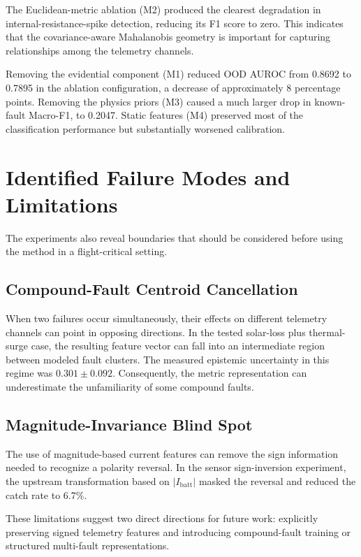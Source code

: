 \documentclass[conference]{IEEEtran}
\begin{document}
The Euclidean-metric ablation (M2) produced the clearest degradation in internal-resistance-spike detection, reducing its F1 score to zero. This indicates that the covariance-aware Mahalanobis geometry is important for capturing relationships among the telemetry channels.

Removing the evidential component (M1) reduced OOD AUROC from 0.8692 to 0.7895 in the ablation configuration, a decrease of approximately 8 percentage points. Removing the physics priors (M3) caused a much larger drop in known-fault Macro-F1, to 0.2047. Static features (M4) preserved most of the classification performance but substantially worsened calibration.

\section{Identified Failure Modes and Limitations}

The experiments also reveal boundaries that should be considered before using the method in a flight-critical setting.

\subsection{Compound-Fault Centroid Cancellation}

When two failures occur simultaneously, their effects on different telemetry channels can point in opposing directions. In the tested solar-loss plus thermal-surge case, the resulting feature vector can fall into an intermediate region between modeled fault clusters. The measured epistemic uncertainty in this regime was $0.301\pm0.092$. Consequently, the metric representation can underestimate the unfamiliarity of some compound faults.

\subsection{Magnitude-Invariance Blind Spot}

The use of magnitude-based current features can remove the sign information needed to recognize a polarity reversal. In the sensor sign-inversion experiment, the upstream transformation based on $|I_{\mathrm{batt}}|$ masked the reversal and reduced the catch rate to 6.7\%.

These limitations suggest two direct directions for future work: explicitly preserving signed telemetry features and introducing compound-fault training or structured multi-fault representations.
\end{document}
